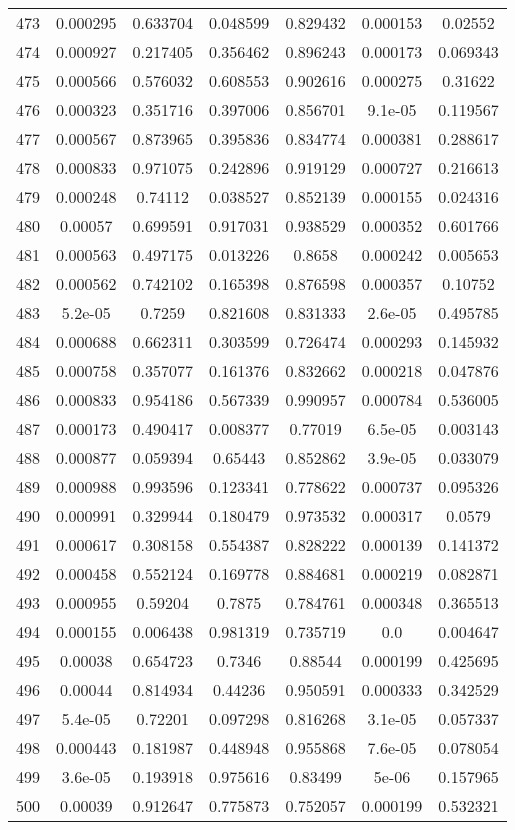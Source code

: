 \begin{table}
\begin{tabular}{c|c|c|c|c|c|c}
473 & 0.000295 & 0.633704 & 0.048599 & 0.829432 & 0.000153 & 0.02552\\
474 & 0.000927 & 0.217405 & 0.356462 & 0.896243 & 0.000173 & 0.069343\\
475 & 0.000566 & 0.576032 & 0.608553 & 0.902616 & 0.000275 & 0.31622\\
476 & 0.000323 & 0.351716 & 0.397006 & 0.856701 & 9.1e-05 & 0.119567\\
477 & 0.000567 & 0.873965 & 0.395836 & 0.834774 & 0.000381 & 0.288617\\
478 & 0.000833 & 0.971075 & 0.242896 & 0.919129 & 0.000727 & 0.216613\\
479 & 0.000248 & 0.74112 & 0.038527 & 0.852139 & 0.000155 & 0.024316\\
480 & 0.00057 & 0.699591 & 0.917031 & 0.938529 & 0.000352 & 0.601766\\
481 & 0.000563 & 0.497175 & 0.013226 & 0.8658 & 0.000242 & 0.005653\\
482 & 0.000562 & 0.742102 & 0.165398 & 0.876598 & 0.000357 & 0.10752\\
483 & 5.2e-05 & 0.7259 & 0.821608 & 0.831333 & 2.6e-05 & 0.495785\\
484 & 0.000688 & 0.662311 & 0.303599 & 0.726474 & 0.000293 & 0.145932\\
485 & 0.000758 & 0.357077 & 0.161376 & 0.832662 & 0.000218 & 0.047876\\
486 & 0.000833 & 0.954186 & 0.567339 & 0.990957 & 0.000784 & 0.536005\\
487 & 0.000173 & 0.490417 & 0.008377 & 0.77019 & 6.5e-05 & 0.003143\\
488 & 0.000877 & 0.059394 & 0.65443 & 0.852862 & 3.9e-05 & 0.033079\\
489 & 0.000988 & 0.993596 & 0.123341 & 0.778622 & 0.000737 & 0.095326\\
490 & 0.000991 & 0.329944 & 0.180479 & 0.973532 & 0.000317 & 0.0579\\
491 & 0.000617 & 0.308158 & 0.554387 & 0.828222 & 0.000139 & 0.141372\\
492 & 0.000458 & 0.552124 & 0.169778 & 0.884681 & 0.000219 & 0.082871\\
493 & 0.000955 & 0.59204 & 0.7875 & 0.784761 & 0.000348 & 0.365513\\
494 & 0.000155 & 0.006438 & 0.981319 & 0.735719 & 0.0 & 0.004647\\
495 & 0.00038 & 0.654723 & 0.7346 & 0.88544 & 0.000199 & 0.425695\\
496 & 0.00044 & 0.814934 & 0.44236 & 0.950591 & 0.000333 & 0.342529\\
497 & 5.4e-05 & 0.72201 & 0.097298 & 0.816268 & 3.1e-05 & 0.057337\\
498 & 0.000443 & 0.181987 & 0.448948 & 0.955868 & 7.6e-05 & 0.078054\\
499 & 3.6e-05 & 0.193918 & 0.975616 & 0.83499 & 5e-06 & 0.157965\\
500 & 0.00039 & 0.912647 & 0.775873 & 0.752057 & 0.000199 & 0.532321\\
\end{tabular}
\end{table}
